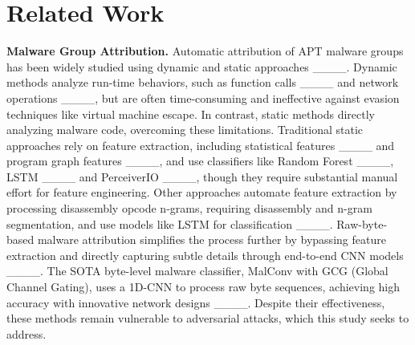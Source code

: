 \section{Related Work}
\label{sec2}

\textbf{Malware Group Attribution. } Automatic attribution of APT malware groups has been widely studied using dynamic and static approaches ____. Dynamic methods analyze run-time behaviors, such as function calls ____ and network operations ____, but are often time-consuming and ineffective against evasion techniques like virtual machine escape. In contrast, static methods directly analyzing malware code, overcoming these limitations. Traditional static approaches rely on feature extraction, including statistical features ____ and program graph features ____, and use classifiers like Random Forest ____, LSTM ____ and PerceiverIO ____, though they require substantial manual effort for feature engineering. Other approaches automate feature extraction by processing disassembly opcode n-grams, requiring disassembly and n-gram segmentation, and use models like LSTM for classification ____. Raw-byte-based malware attribution simplifies the process further by bypassing feature extraction and directly capturing subtle details through end-to-end CNN models ____. The SOTA byte-level malware classifier, MalConv with GCG (Global Channel Gating), uses a 1D-CNN to process raw byte sequences, achieving high accuracy with innovative network designs ____. Despite their effectiveness, these methods remain vulnerable to adversarial attacks, which this study seeks to address.




